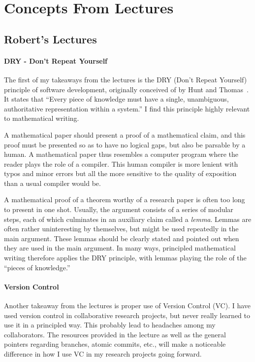 \section*{Concepts From Lectures}
\subsection*{Robert's Lectures}
\paragraph{DRY - Don’t Repeat Yourself} The first of my takeaways from the lectures is the DRY (Don't Repeat Yourself) principle of software development, originally conceived of by Hunt and Thomas~\cite{huntPragmaticProgrammerJourneyman2000a}. It states that ``Every piece of knowledge must have a single, unambiguous, authoritative representation within a system.'' I find this principle highly relevant to mathematical writing. 

A mathematical paper should present a proof of a mathematical claim, and this proof must be presented so as to have no logical gaps, but also be parsable by a human. A mathematical paper thus resembles a computer program where the reader plays the role of a compiler. This human compiler is more lenient with typos and minor errors but all the more sensitive to the quality of exposition than a usual compiler would be. 

A mathematical proof of a theorem worthy of a research paper is often too long to present in one shot. Usually, the argument consists of a series of modular steps, each of which culminates in an auxiliary claim called a \emph{lemma}. Lemmas are often rather uninteresting by themselves, but might be used repeatedly in the main argument. These lemmas should be clearly stated and pointed out when they are used in the main argument. In many ways, principled mathematical writing therefore applies the DRY principle, with lemmas playing the role of the ``pieces of knowledge.''

\paragraph{Version Control} 
Another takeaway from the lectures is proper use of Version Control (VC). I have used version control in collaborative research projects, but never really learned to use it in a principled way. This probably lead to headaches among my collaborators. The resources provided in the lecture as well as the general pointers regarding branches, atomic commits, etc., will make a noticeable difference in how I use VC in my research projects going forward. 

